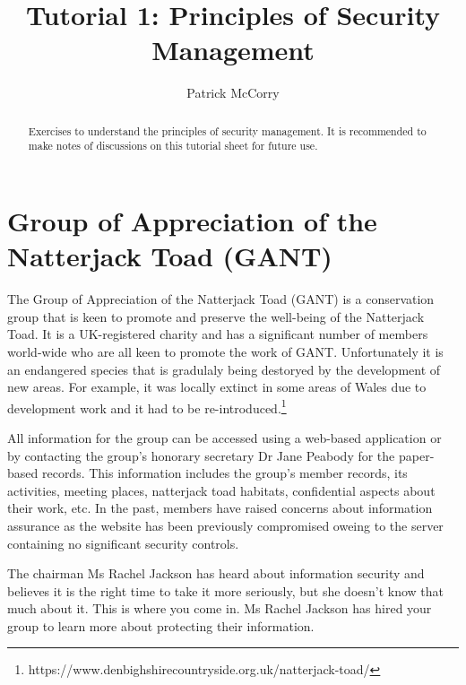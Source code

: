 \documentclass{llncs}
\begin{document}
	\title{Tutorial 1: Principles of Security Management}
	
	\author{Patrick McCorry}
	
	
	
	\maketitle
	\begin{abstract}
	Exercises to understand the principles of security management. 
	It is recommended to make notes of discussions on this tutorial sheet for future use. 
	\end{abstract} 

\section{Group of Appreciation of the Natterjack Toad (GANT)}

The Group of Appreciation of the Natterjack Toad (GANT) is a conservation group that is keen to promote and preserve the well-being of the Natterjack Toad. 
It is a UK-registered charity and has a significant number of members world-wide who are all keen to promote the work of GANT. 
Unfortunately it is an endangered species that is gradulaly being destoryed by the development of new areas. 
For example, it was locally extinct in some areas of Wales due to development work and it had to be re-introduced.\footnote{https://www.denbighshirecountryside.org.uk/natterjack-toad/}

All information for the group can be accessed using a web-based application or by contacting the group's honorary secretary Dr Jane Peabody for the paper-based records. 
This information includes the group's member records, its activities, meeting places, natterjack toad habitats, confidential aspects about their work, etc. 
In the past, members have raised concerns about information assurance as the website has been previously compromised oweing to the server containing no significant security controls. 

The chairman Ms Rachel Jackson has heard about information security and believes it is the right time to take it more seriously, but she doesn't know that much about it. 
This is where you come in. Ms Rachel Jackson has hired your group to learn more about protecting their information. 
\end{document}

